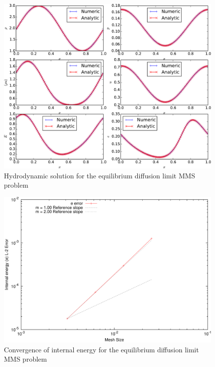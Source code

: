 \begin{figure}[ht]
   \centering
   \includegraphics[width=\textwidth]{figures/MMS_diffusion_limit_solution.pdf}
   \caption{Hydrodynamic solution for the equilibrium diffusion limit MMS problem}
   \label{fig:MMS_diffusion_limit_solution}
\end{figure}

\begin{figure}[ht]
   \centering
   \includegraphics[width=\textwidth]{figures/MMS_diffusion_limit_convergence.pdf}
   \caption{Convergence of internal energy for the equilibrium diffusion limit MMS problem}
   \label{fig:MMS_diffusion_limit_convergence}
\end{figure}

